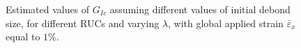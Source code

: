 \begin{figure}[!h]
\centering
    \quad
\caption{Estimated values of $G_{Ic}$ assuming different values of initial debond size, for different RUCs and varying $\lambda$, with global applied strain $\bar{\varepsilon}_{x}$ equal to $1\%$.}\label{paperE:fig:GIc}
\end{figure}

